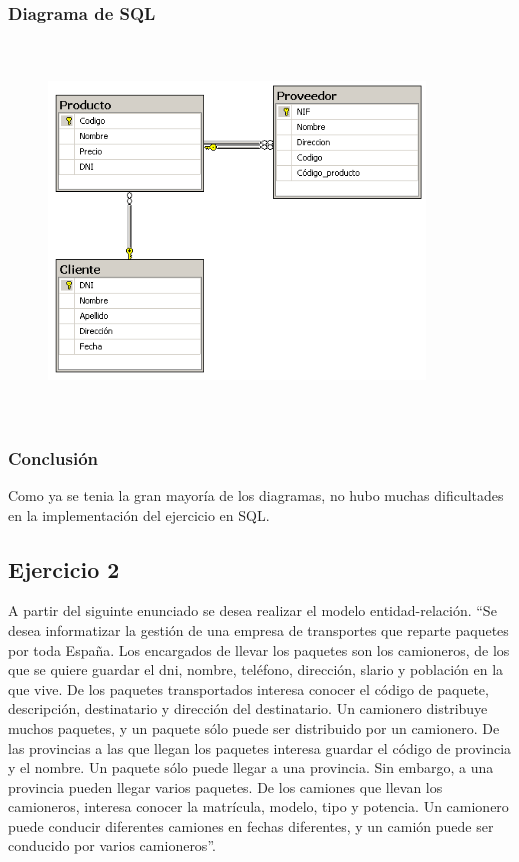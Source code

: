 \documentclass[a4paper, 12pt]{article}
\begin{document}
\begin{justify}
        \subsubsection{Diagrama de SQL}
        \begin{figure}[H]
            \centering
            \includegraphics[width=10cm,height=10cm]{sql1.png}
        \end{figure}
        \subsubsection{Conclusión}
        \justify
        Como ya se tenia la gran mayoría de los diagramas, no hubo muchas dificultades en la implementación del ejercicio en SQL.
        \subsection{Ejercicio 2}
        \justify
        A partir del siguinte enunciado se desea realizar el modelo entidad-relación. ``Se desea informatizar la gestión de una empresa
        de transportes que reparte paquetes por toda España. Los encargados de llevar los paquetes son los camioneros, de los que se quiere
        guardar el dni, nombre, teléfono, dirección, slario y población en la que vive. De los paquetes transportados interesa conocer el
        código de paquete, descripción, destinatario y dirección del destinatario. Un camionero distribuye muchos paquetes, y un paquete sólo
        puede ser distribuido por un camionero. De las provincias a las que llegan los paquetes interesa guardar el código de provincia y el
        nombre. Un paquete sólo puede llegar a una provincia. Sin embargo, a una provincia pueden llegar varios paquetes. De los camiones que llevan
        los camioneros, interesa conocer la matrícula, modelo, tipo y potencia. Un camionero puede conducir diferentes camiones en fechas diferentes,
        y un camión puede ser conducido por varios camioneros''.

\end{justify}
\end{document}

